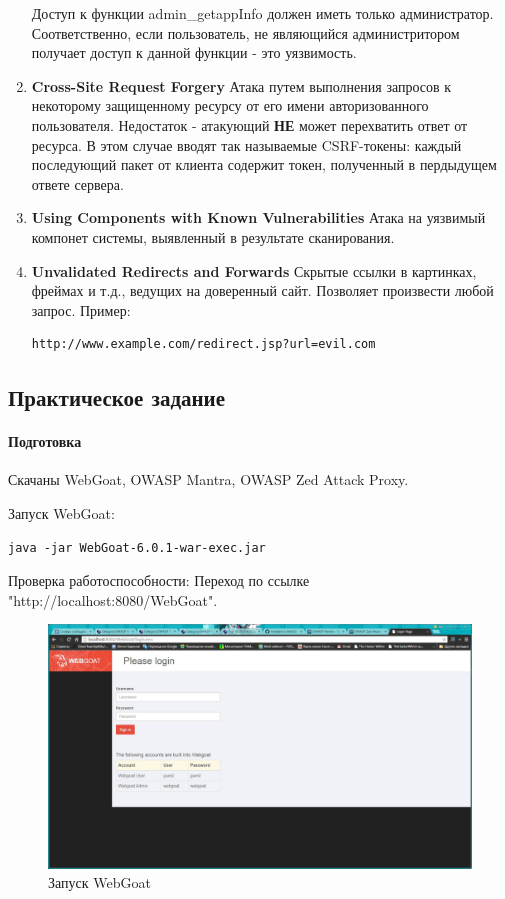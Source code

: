 \documentclass[10pt,a4paper]{article}
\begin{document}
\begin{enumerate}
Доступ к функции admin\_getappInfo должен иметь только администратор. Соответственно, если пользователь, не являющийся администритором получает доступ к данной функции - это уязвимость.

\item \textbf{Cross-Site Request Forgery} Атака путем выполнения запросов к некоторому защищенному ресурсу от его имени авторизованного пользователя. Недостаток - атакующий \textbf{НЕ} может перехватить ответ от ресурса. В этом случае вводят так называемые CSRF-токены: каждый последующий пакет от клиента содержит токен, полученный в пердыдущем ответе сервера.

\item \textbf{Using Components with Known Vulnerabilities} Атака на уязвимый компонет системы, выявленный в результате сканирования.

\item \textbf{Unvalidated Redirects and Forwards} Скрытые ссылки в картинках, фреймах и т.д., ведущих на доверенный сайт. Позволяет произвести любой запрос.
Пример:
\begin{verbatim}
http://www.example.com/redirect.jsp?url=evil.com
\end{verbatim}
\end{enumerate}

\subsection{Практическое задание}

\paragraph{Подготовка}
Скачаны WebGoat, OWASP Mantra, OWASP Zed Attack Proxy. 

Запуск WebGoat:
\begin{verbatim}
java -jar WebGoat-6.0.1-war-exec.jar
\end{verbatim}

Проверка работоспособности:
Переход по ссылке "http://localhost:8080/WebGoat".

\begin{figure}[h!]
\centering
\includegraphics[scale=0.3]{WebGoat.jpg}
\caption{Запуск WebGoat}
\end{figure}
\end{document}
